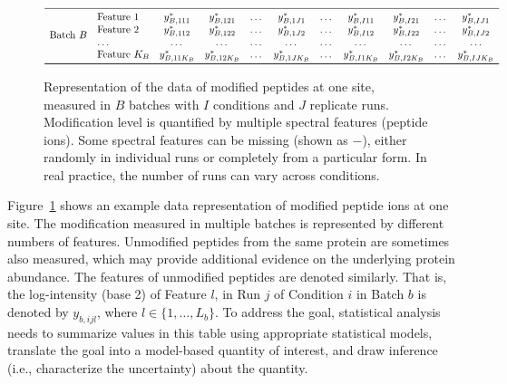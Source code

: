 \documentclass{mcp}
\def\sfigref#1{{Figure~\ref{#1}}}
\begin{document}
\begin{figure}[h!]
\begin{footnotesize}
\[\begin{array}{l l c c c c c c c c c}
\midrule
\multirow{4}{*}{Batch $B$} & \text{Feature }1 & y_{B,111}^{\ast} & y_{B,121}^{\ast} & \dots & y_{B,1J1}^{\ast} & \dots & y_{B,I11}^{\ast} & y_{B,I21}^{\ast} & \dots & y_{B,IJ1}^{\ast} \\
 & \text{Feature }2 & y_{B,112}^{\ast} & y_{B,122}^{\ast} & \dots & y_{B,1J2}^{\ast} & \dots & y_{B,I12}^{\ast} & y_{B,I22}^{\ast} & \dots & y_{B,IJ2}^{\ast}  \\
 & \dots & \dots & \dots & \dots & \dots & \dots & \dots & \dots & \dots & \dots \\
 & \text{Feature }K_B & y_{B,11K_B}^{\ast} & y_{B,12K_B}^{\ast} & \dots & y_{B,1JK_B}^{\ast} & \dots & y_{B,I1K_B}^{\ast} & y_{B,I2K_B}^{\ast} & \dots & y_{B,IJK_B}^{\ast} \\
\bottomrule
\end{array}
\]
\end{footnotesize}
\caption{Representation of the data of modified peptides at one site, measured in $B$ batches with $I$ conditions and $J$ replicate runs. Modification level is quantified by multiple spectral features (peptide ions). Some spectral features can be missing (shown as $-$), either randomly in individual runs or completely from a particular form. In real practice, the number of runs can vary across conditions. \label{fig:dtable}}
\end{figure}

\sfigref{fig:dtable} shows an example data representation of modified peptide ions at one site. The modification measured in multiple batches is represented by different numbers of features. Unmodified peptides from the same protein are sometimes also measured, which may provide additional evidence on the underlying protein abundance. The features of unmodified peptides are denoted similarly. That is, the log-intensity (base 2) of Feature $l$, in Run $j$ of Condition $i$ in Batch $b$ is denoted by $y_{b,ijl}$, where $l \in \{1, \ldots , L_b \}$. To address the goal, statistical analysis needs to summarize values in this table using appropriate statistical models, translate the goal into a model-based quantity of interest, and draw inference (i.e., characterize the uncertainty) about the quantity. 
\end{document}
